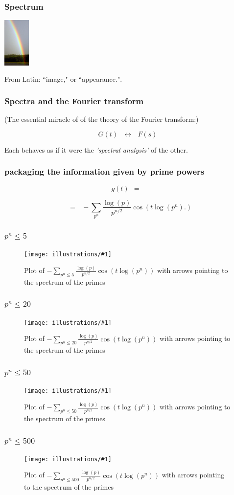 \documentclass{beamer}
\newcommand{\ill}[3]{%
   \begin{figure}[H]%
   \vspace{-2ex}
   \centering%
   \texttt{[image: illustrations/\#1]}%
   \caption{#3}%
   \vspace{-2ex}
    \end{figure}}
\begin{document}
\begin{frame}\frametitle{\bf Spectrum}

  \hskip100pt   \includegraphics[width=0.1\textwidth]{illustrations/rainbow}

\vskip10pt
 {\Huge From Latin:\vskip10pt ``image," or ``appearance.".}\end{frame}
  \begin{frame}\frametitle{\bf Spectra and the Fourier transform}

(The essential miracle of of the theory of the Fourier transform:)
\vskip10pt
{\Huge $$  G(t) \ \ \ \leftrightarrow \ \ \ F(s)$$

\vskip10pt

Each behaves as if it were  the \vskip5pt {\it 'spectral analysis'} of the other.}\end{frame}
\begin{frame}\frametitle{\bf packaging the information given by prime powers}
{\Huge $$ g(t)\ \ =\ \ $$

\vskip10pt

$$\ \ \ = \ \ \ -\sum_{p^n}{\frac{\log(p)}{p^{n/2}}}\cos(t\log(p^n).)
$$}\end{frame}
\begin{frame}\frametitle{\bf $p^n \leq 5$}
{\Huge
\ill{phihat_even-5}{1}{Plot of $-\sum_{p^n\leq 5}{\frac{\log(p)}{p^{n/2}}}\cos(t\log(p^n))$ with
arrows pointing to the spectrum of the primes\label{fig:pnsum5}}
}\end{frame}
\begin{frame}\frametitle{\bf $p^n \leq 20$}
{\Huge
\ill{phihat_even-20}{1}{Plot of $-\sum_{p^n\leq 20}{\frac{\log(p)}{p^{n/2}}}\cos(t\log(p^n))$ with arrows pointing to the spectrum of the primes}}\end{frame}
\begin{frame}\frametitle{\bf $p^n \leq 50$}
{\Huge

\ill{phihat_even-50}{1}{Plot of $-\sum_{p^n\leq 50}{\frac{\log(p)}{p^{n/2}}}\cos(t\log(p^n))$ with arrows pointing to the spectrum of the primes}}\end{frame}


\begin{frame}\frametitle{\bf $p^n \leq 500$}
{\Huge   \ill{phihat_even-500}{1}{Plot of $-\sum_{p^n\leq
      500}{\frac{\log(p)}{p^{n/2}}}\cos(t\log(p^n))$ with arrows
    pointing to the spectrum of the primes\label{fig:pnsum500}}}\end{frame}
\end{document}

